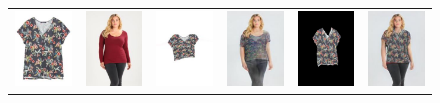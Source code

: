 \begin{figure}[t]
\begin{tabular}{cc|cc|cc}
\includegraphics[width=2cm]{figures/cloth/002353_1.jpg}&
\includegraphics[width=2cm]{figures/image/007029_0.jpg}&
\includegraphics[width=2cm]{figures/cp-vton/warp-cloth/002353_1_007029_0.jpg}&
\includegraphics[width=2cm]{figures/cp-vton/try-on/002353_1_007029_0.jpg}&
\includegraphics[width=2cm]{figures/c3dwfull/002353_1_007029_0.png}&
\includegraphics[width=2cm]{figures/try-on/002353_1_007029_0.jpg}\\


\end{tabular}
\end{figure}
